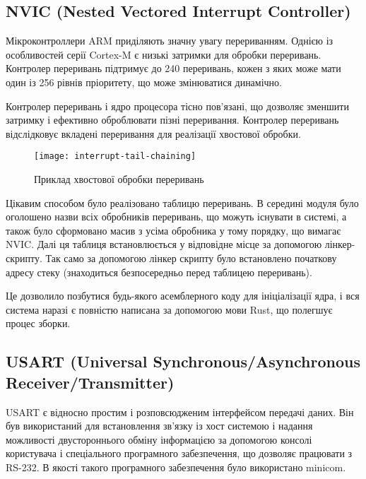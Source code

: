 \documentclass[main.tex]{subfiles}
\begin{document}
\subsection{NVIC (Nested Vectored Interrupt Controller)}

Мікроконтроллери ARM приділяють значну увагу перериванням. Однією із особливостей серії Cortex-M є низькі затримки для обробки переривань. Контролер переривань підтримує до 240 переривань\cite{cortex-m:nvic}, кожен з яких може мати один із 256 рівнів пріоритету, що може змінюватися динамічно.

Контролер переривань і ядро процесора тісно пов'язані, що дозволяє зменшити затримку і ефективно оброблювати пізні переривання. Контролер переривань відслідковує вкладені переривання для реалізації хвостової обробки.

\begin{figure}[h]
  \texttt{[image: interrupt-tail-chaining]}
  \caption{Приклад хвостової обробки переривань}\label{fig:interrupt-tail-chaining}
\end{figure}

Цікавим способом було реалізовано таблицю переривань. В середині модуля  було оголошено назви всіх обробників переривань, що можуть існувати в системі, а також було сформовано масив з усіма обробника у тому порядку, що вимагає NVIC. Далі ця таблиця встановлюється у відповідне місце за допомогою лінкер-скрипту. Так само за допомогою лінкер скрипту було встановлено початкову адресу стеку (знаходиться безпосередньо перед таблицею переривань).

Це дозволило позбутися будь-якого асемблерного коду для ініціалізації ядра, і вся система наразі є повністю написана за допомогою мови Rust, що полегшує процес зборки.

\subsection{USART (Universal Synchronous\slash{}\hspace{0pt}Asynchronous Receiver\slash{}\hspace{0pt}Transmitter)}

  USART є відносно простим і розповсюдженим інтерфейсом передачі даних. Він був використаний для встановлення зв'язку із хост системою і надання можливості двустороннього обміну інформацією за допомогою консолі користувача і спеціального програмного забезпечення, що дозволяє працювати з RS-232. В якості такого програмного забезпечення було використано minicom.
\end{document}

